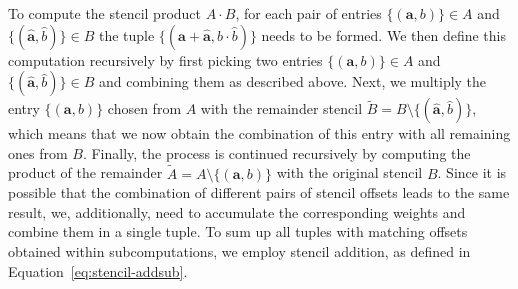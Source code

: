 To compute the stencil product $A \cdot B$, for each pair of entries $\{(\bm{a}, b ) \} \in A$ and $\{(\bm{\hat{a}}, \hat{b} ) \} \in B$ the tuple $\{(\bm{a} + \bm{\hat{a}}, b \cdot \hat{b} ) \}$ needs to be formed.
We then define this computation recursively by first picking two entries $\{(\bm{a}, b ) \} \in A$ and $\{(\bm{\hat{a}}, \hat{b} ) \} \in B$ and combining them as described above.
Next, we multiply the entry $\{(\bm{a}, b ) \}$ chosen from $A$ with the remainder stencil $\tilde{B} = B \setminus \{(\bm{\hat{a}}, \hat{b} ) \}$, which means that we now obtain the combination of this entry with all remaining ones from $B$.
Finally, the process is continued recursively by computing the product of the remainder $\tilde{A} = A \setminus \{(\bm{a}, b ) \}$ with the original stencil $B$.
Since it is possible that the combination of different pairs of stencil offsets leads to the same result, we, additionally, need to accumulate the corresponding weights and combine them in a single tuple.
To sum up all tuples with matching offsets obtained within subcomputations, we employ stencil addition, as defined in Equation~\eqref{eq:stencil-addsub}.
